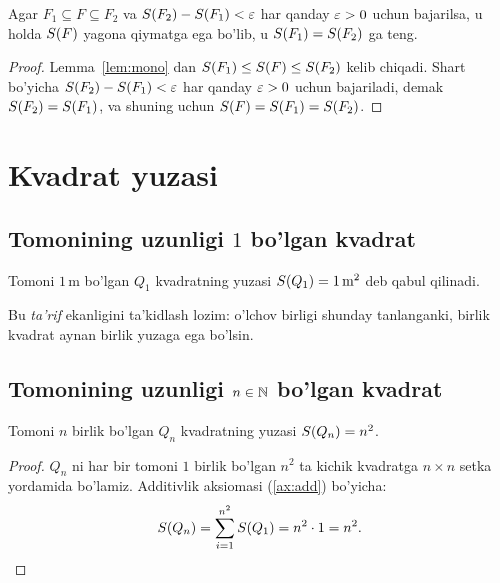 \begin{lemma}
\label{lem:squeeze}
Agar $F_1 \subseteq F \subseteq F_2$ va $S\!\left(F_2\right) - S\!\left(F_1\right) < \varepsilon$
har qanday $\varepsilon > 0$ uchun bajarilsa, u holda $S\!\left(F\right)$ yagona qiymatga ega
bo'lib, u $S\!\left(F_1\right) = S\!\left(F_2\right)$ ga teng.
\end{lemma}
\begin{proof}
Lemma~\ref{lem:mono} dan $S\!\left(F_1\right) \le S\!\left(F\right) \le S\!\left(F_2\right)$ kelib chiqadi.
Shart bo'yicha $S\!\left(F_2\right) - S\!\left(F_1\right) < \varepsilon$ har qanday $\varepsilon>0$ uchun
bajariladi, demak $S\!\left(F_2\right) = S\!\left(F_1\right)$, va shuning uchun
$S\!\left(F\right) = S\!\left(F_1\right) = S\!\left(F_2\right)$.
\end{proof}

\section{Kvadrat yuzasi}
\label{sec:square}

\subsection{Tomonining uzunligi \texorpdfstring{$1$}{1} bo'lgan kvadrat}
\label{subsec:sq1}

\begin{aksioma}
Tomoni $1\,\text{m}$ bo'lgan $Q_1$ kvadratning yuzasi $S\!\left(Q_1\right)=1\,\text{m}^2$
deb qabul qilinadi.
\end{aksioma}

Bu \emph{ta'rif} ekanligini ta'kidlash lozim: o'lchov birligi shunday tanlanganki,
birlik kvadrat aynan birlik yuzaga ega bo'lsin.

\subsection{Tomonining uzunligi \texorpdfstring{$n \in \mathbb{N}$}{n ∈ N} bo'lgan kvadrat}
\label{subsec:sqn}

\begin{teorema}
\label{thm:sq_nat}
Tomoni $n$ birlik bo'lgan $Q_n$ kvadratning yuzasi $S\!\left(Q_n\right) = n^2$.
\end{teorema}
\begin{proof}
$Q_n$ ni har bir tomoni $1$ birlik bo'lgan $n^2$ ta kichik kvadratga $n\times n$
setka yordamida bo'lamiz.
Additivlik aksiomasi (\ref{ax:add}) bo'yicha:
\[
  S\!\left(Q_n\right) = \sum_{i=1}^{n^2} S\!\left(Q_1\right) = n^2 \cdot 1 = n^2.
\]
\end{proof}

